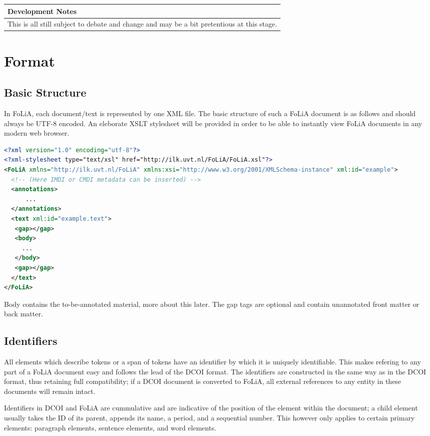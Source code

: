 \documentclass[a4paper,12pt]{report}
\newenvironment{devnotes}
{\newpage
\begin{center}
    \begin{tabular}[h!]{|p{0.8\textwidth}|}
    \hline
    {\bf Development Notes}\\\hline}
{   \\\hline
    \end{tabular}
\end{center}}
\begin{document}
\begin{devnotes}
This is all still subject to debate and change and may be a bit pretentious at this stage.
\end{devnotes}

\chapter{Format}

\section{Basic Structure}

In FoLiA, each document/text is represented by one XML file. The basic structure of such a FoLiA document is as follows and should always be UTF-8 encoded. An eleborate XSLT stylesheet will be provided in order to be able to instantly view FoLiA documents in any modern web browser.

\begin{lstlisting}[language=xml]
<?xml version="1.0" encoding="utf-8"?>
<?xml-stylesheet type="text/xsl" href="http://ilk.uvt.nl/FoLiA/FoLiA.xsl"?>
<FoLiA xmlns="http://ilk.uvt.nl/FoLiA" xmlns:xsi="http://www.w3.org/2001/XMLSchema-instance" xml:id="example">
  <!-- (Here IMDI or CMDI metadata can be inserted) -->
  <annotations>
      ...
  </annotations>    
  <text xml:id="example.text">
   <gap></gap>
   <body>
     ...
   </body>
   <gap></gap>
  </text>
</FoLiA>  
\end{lstlisting}

Body contains the to-be-annotated material, more about this later. The gap tags are optional and contain unannotated front matter or back matter.

\section{Identifiers}

All elements which describe tokens or a span of tokens have an identifier by which it is uniquely identifiable. This makes refering to any part of a FoLiA document easy and follows the lead of the DCOI format. The identifiers are constructed in the same way as in the DCOI format, thus retaining full compatibility; if a DCOI document is converted to FoLiA, all external references to any entity in these documents will remain intact.

Identifiers in DCOI and FoLiA are cummulative and are indicative of the position of the element within the document; a child element usually takes the ID of its parent, appends its name, a period, and a sequential number. This however only applies to certain primary elements: paragraph elements, sentence elements, and word elements.
\end{document}
